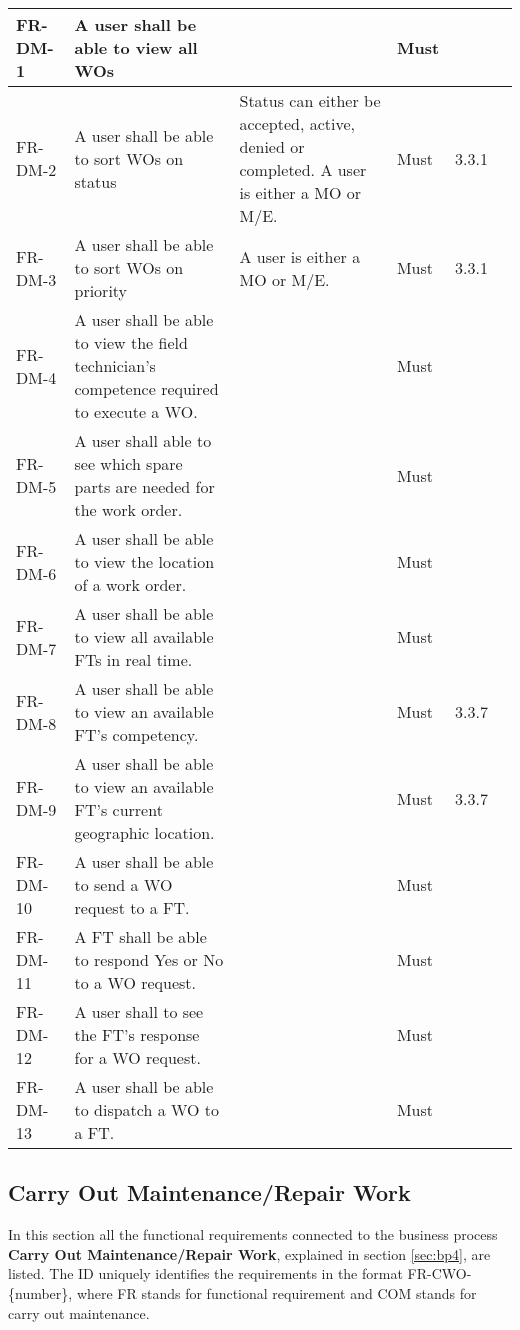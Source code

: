 \begin{center}
\begin{longtable}{|l|p{4cm}|p{4cm}|l|l|l|}
\hline
FR-DM-1	& A user shall be able to view all WOs& & Must & \\ 
\hline
FR-DM-2	&A user shall be able to sort WOs  on status &Status can either be accepted, active, denied or completed. A user is either a MO or  M/E. & Must &3.3.1 \\ 
\hline
FR-DM-3	&A user shall be able to sort WOs  on priority &A user is either a MO or  M/E. & Must & 3.3.1\\ 
\hline
FR-DM-4	&A user shall be able to view the field technician's competence required to execute a WO. & & Must & \\ 
\hline
FR-DM-5	&A user shall able to see which spare parts are needed for the work order. & & Must & \\ 
\hline
FR-DM-6	&A user shall be able to view the location of a work order. & & Must & \\ 
\hline
FR-DM-7	&A user shall be able to view all available FTs in real time. & & Must & \\ 
\hline
FR-DM-8	&A user shall be able to view an available FT's competency. & & Must & 3.3.7\\ 
\hline
FR-DM-9	&A user shall be able to view an available FT's current geographic location. & & Must & 3.3.7 \\ 
\hline
FR-DM-10&A user shall be able to send a WO request to a FT. & & Must & \\ 
\hline
FR-DM-11&A FT shall be able to respond Yes or No to a WO request. & & Must & \\ 
\hline
FR-DM-12&A user shall to see the FT's response for a WO request. & & Must & \\ 
\hline
FR-DM-13&A user shall be able to dispatch a WO to a FT. & & Must & \\ 
\hline

\end{longtable}
\end{center}


\subsection{Carry Out Maintenance/Repair Work}
\label{sub:carry_out_maintenance}
In this section all the functional requirements connected to the business process \textbf{Carry Out Maintenance/Repair Work}, explained in section \ref{sec:bp4}, are listed. The ID uniquely identifies the requirements in the format FR-CWO-\{number\}, where  FR stands for functional requirement and COM stands for carry out maintenance.  



